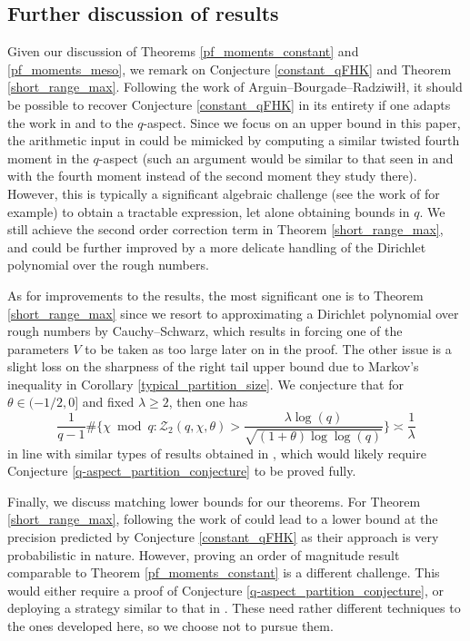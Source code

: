 \documentclass[10pt,a4paper]{amsart}
\numberwithin{equation}{section}
\begin{document}
\subsection{Further discussion of results} \label{further_disc}
Given our discussion of Theorems \ref{pf_moments_constant} and \ref{pf_moments_meso}, we remark on Conjecture \ref{constant_qFHK} and Theorem \ref{short_range_max}. Following the work of Arguin--Bourgade--Radziwi\l{}\l{}, it should be possible to recover Conjecture \ref{constant_qFHK} in its entirety if one adapts the work in \cite{abr20} and \cite{abr23} to the $q$-aspect. Since we focus on an upper bound in this paper, the arithmetic input in \cite{abr20} could be mimicked by computing a similar twisted fourth moment in the $q$-aspect (such an argument would be similar to that seen in \cite{ac25} and \cite{creighton25} with the fourth moment instead of the second moment they study there). However, this is typically a significant algebraic challenge (see the work of \cite{gz25twisted} for example) to obtain a tractable expression, let alone obtaining bounds in $q$. We still achieve the second order correction term in Theorem \ref{short_range_max}, and could be further improved by a more delicate handling of the Dirichlet polynomial over the rough numbers. \par
As for improvements to the results, the most significant one is to Theorem \ref{short_range_max} since we resort to approximating a Dirichlet polynomial over rough numbers by Cauchy--Schwarz, which results in forcing one of the parameters $V$ to be taken as too large later on in the proof. The other issue is a slight loss on the sharpness of the right tail upper bound due to Markov's inequality in Corollary \ref{typical_partition_size}. We conjecture that for $\theta \in (-1/2,0]$ and fixed $\lambda \geq 2$, then one has
$$\frac{1}{q-1}\# \big\{\chi \bmod{q}: \mathcal{Z}_2(q,\chi,\theta) > \frac{\lambda \log(q)}{\sqrt{(1+\theta)\log\log(q)}}\big\} \asymp \frac{1}{\lambda}$$
in line with similar types of results obtained in \cite{barral15}, which would likely require Conjecture \ref{q-aspect_partition_conjecture} to be proved fully. \par
Finally, we discuss matching lower bounds for our theorems. For Theorem \ref{short_range_max}, following the work of \cite{abr23} could lead to a lower bound at the precision predicted by Conjecture \ref{constant_qFHK} as their approach is very probabilistic in nature. However, proving an order of magnitude result comparable to Theorem \ref{pf_moments_constant} is a different challenge. This would either require a proof of Conjecture \ref{q-aspect_partition_conjecture}, or deploying a strategy similar to that in \cite{harper26}. These need rather different techniques to the ones developed here, so we choose not to pursue them.
\end{document}
